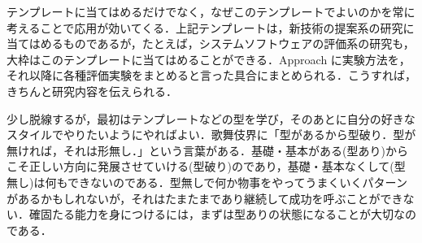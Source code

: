 \documentclass[a4j]{jarticle}
\begin{document}
テンプレートに当てはめるだけでなく，なぜこのテンプレートでよいのかを常に考えることで応用が効いてくる．上記テンプレートは，新技術の提案系の研究に当てはめるものであるが，たとえば，システムソフトウェアの評価系の研究も，大枠はこのテンプレートに当てはめることができる．Approach に実験方法を，それ以降に各種評価実験をまとめると言った具合にまとめられる．こうすれば，きちんと研究内容を伝えられる．

少し脱線するが，最初はテンプレートなどの型を学び，そのあとに自分の好きなスタイルでやりたいようにやればよい．歌舞伎界に「型があるから型破り．型が無ければ，それは形無し．」という言葉がある．基礎・基本がある(型あり)からこそ正しい方向に発展させていける(型破り)のであり，基礎・基本なくして(型無し)は何もできないのである．型無しで何か物事をやってうまくいくパターンがあるかもしれないが，それはたまたまであり継続して成功を呼ぶことができない．確固たる能力を身につけるには，まずは型ありの状態になることが大切なのである．
\end{document}

